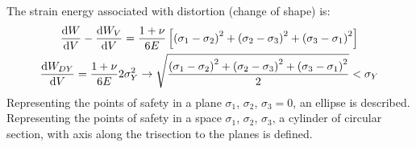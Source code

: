 \documentclass[class=report, crop=false, 12pt,a4paper]{standalone}
\begin{document}
The strain energy associated with distortion (change of shape) is:
\begin{gather}
  \frac{\dif W}{\dif V} - \frac{\dif W_V}{\dif V} = \frac{1+ \nu}{6E} \left[\left(\sigma_1 - \sigma_2\right)^2 + \left(\sigma_2-\sigma_3\right)^2 + \left(\sigma_3-\sigma_1\right)^2\right]\\
  \frac{\dif W_{DY}}{\dif V} = \frac{1+\nu}{6E} 2 \sigma_Y^2 \rightarrow \sqrt{\frac{\left(\sigma_1-\sigma_2\right)^2 + \left(\sigma_2-\sigma_3\right)^2 + \left(\sigma_3-\sigma_1\right)^2}{2}} < \sigma_Y
\end{gather}
Representing the points of safety in a plane $\sigma_1$, $\sigma_2$, $\sigma_3 = 0$, an ellipse is described. Representing the points of safety in a space $\sigma_1$, $\sigma_2$, $\sigma_3$, a cylinder of circular section, with axis along the trisection to the planes is defined.
\end{document}
